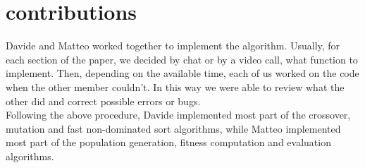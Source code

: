 \section{contributions}
Davide and Matteo worked together to implement the algorithm.
Usually, for each section of the paper\cite{fire_distinguish}, we decided by chat or by a video call,
what function to implement. Then, depending on the available time, each of us
worked on the code when the other member couldn't. In this way we were able 
to review what the other did and correct possible errors or bugs.\\
Following the above procedure, Davide implemented most part of the crossover, mutation and fast non-dominated sort algorithms,
while Matteo implemented most part of the population generation, fitness computation and evaluation algorithms.